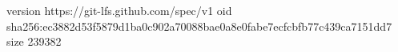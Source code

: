 version https://git-lfs.github.com/spec/v1
oid sha256:ec3882d53f5879d1ba0c902a70088bae0a8e0fabe7ecfcbfb77c439ca7151dd7
size 239382
